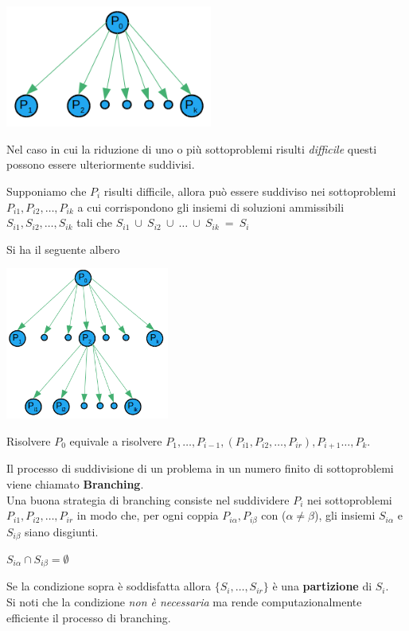 \centerline{\includegraphics[height=4cm]{images/graph14.png}}

Nel caso in cui la riduzione di uno o più sottoproblemi risulti \emph{difficile} questi possono essere ulteriormente suddivisi.

Supponiamo che $P_{i}$ risulti difficile, allora può essere suddiviso nei sottoproblemi $P_{i1},P_{i2},\dots,P_{ik}$ a cui corrispondono gli insiemi di soluzioni ammissibili $S_{i1},S_{i2},\dots,S_{ik}$ tali che $S_{i1}\ \cup\ S_{i2}\ \cup\ \dots\ \cup\ S_{ik}\ =\ S_{i}$

\clearpage
Si ha il seguente albero

\centerline{\includegraphics[height=5cm]{images/graph15.png}}

Risolvere $P_{0}$ equivale a risolvere $P_{1},\dots,P_{i-1},(P_{i1},P_{i2},\dots,P_{ir}),P_{i+1}\dots,P_{k}$.

Il processo di suddivisione di un problema in un numero finito di sottoproblemi viene chiamato \textbf{Branching}.\\
Una buona strategia di branching consiste nel suddividere $P_{i}$ nei sottoproblemi $P_{i1},P_{i2},\dots,P_{ir}$ in modo che, per ogni coppia $P_{i\alpha},P_{i\beta}$ con ($\alpha \neq \beta$), gli insiemi $S_{i\alpha}$ e $S_{i\beta}$ siano disgiunti.\\

\centerline{$S_{i\alpha} \cap S_{i\beta} = \emptyset$}

Se la condizione sopra è soddisfatta allora $\{S_{i},\dots,S_{ir}\}$ è una \textbf{partizione} di $S_{i}$.\\
Si noti che la condizione \textit{non è necessaria} ma rende computazionalmente efficiente il processo di branching.

